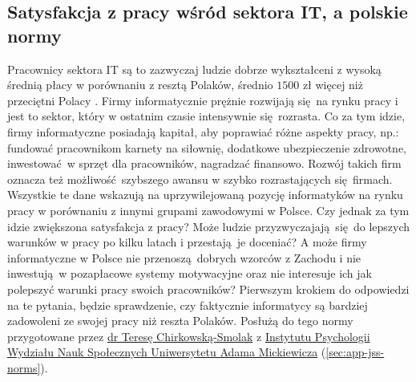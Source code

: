 \subsection{Satysfakcja z pracy wśród sektora IT, a polskie normy}
\label{sec:hip-sat-norms}
Pracownicy sektora IT są to zazwyczaj ludzie dobrze wykształceni z wysoką średnią płacy w porównaniu z resztą Polaków, średnio $1500$ zł więcej niż przeciętni Polacy \cite{web:earnings-it,web:earnings-pl}. Firmy informatycznie prężnie rozwijają się na rynku pracy i jest to sektor, który w ostatnim czasie intensywnie się rozrasta. Co za tym idzie, firmy informatyczne posiadają kapitał, aby poprawiać różne aspekty pracy, np.: fundować pracownikom karnety na siłownię, dodatkowe ubezpieczenie zdrowotne, inwestować w sprzęt dla pracowników, nagradzać
finansowo. Rozwój takich firm oznacza też możliwość szybszego awansu w szybko rozrastających się firmach. Wszystkie te dane wskazują na uprzywilejowaną pozycję informatyków na rynku pracy w porównaniu z innymi grupami zawodowymi w Polsce. Czy jednak za tym idzie zwiększona satysfakcja z pracy? Może ludzie przyzwyczajają się do lepszych warunków w pracy po kilku latach i przestają je doceniać? A może firmy informatyczne w Polsce nie
przenoszą dobrych wzorców z Zachodu i nie inwestują w pozapłacowe systemy motywacyjne oraz nie interesuje ich jak polepszyć warunki pracy swoich pracowników? Pierwszym krokiem do odpowiedzi na te pytania, będzie sprawdzenie, czy faktycznie informatycy są bardziej zadowoleni ze swojej pracy niż reszta Polaków. Posłużą do tego normy przygotowane przez
\href{http://www.psychologia.amu.edu.pl/ip-uam/struktura-zatrudnienia-w-instytucie/curriculum-vitae-teresa-chirkowska-smolak/}{dr Teresę Chirkowską-Smolak} z \href{http://www.psychologia.amu.edu.pl/}{Instytutu Psychologii Wydziału Nauk Społecznych Uniwersytetu Adama Mickiewicza} (\ref{sec:app-jss-norms}).

